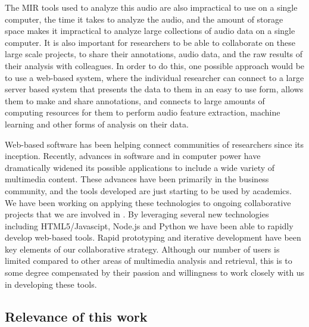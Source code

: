 \documentclass[12pt,oneside]{book}
\begin{document}
The MIR tools used to analyze this audio are also impractical to use
on a single computer, the time it takes to analyze the audio, and the
amount of storage space makes it impractical to analyze large
collections of audio data on a single computer.  It is also important
for researchers to be able to collaborate on these large scale
projects, to share their annotations, audio data, and the raw results
of their analysis with colleagues.  In order to do this, one possible
approach would be to use a web-based system, where the individual
researcher can connect to a large server based system that presents
the data to them in an easy to use form, allows them to make and share
annotations, and connects to large amounts of computing resources for
them to perform audio feature extraction, machine learning and other
forms of analysis on their data.
 
Web-based software has been helping connect communities of researchers
since its inception.  Recently, advances in software and in computer
power have dramatically widened its possible applications to include a
wide variety of multimedia content.  These advances have been
primarily in the business community, and the tools developed are just
starting to be used by academics. We have been working on applying
these technologies to ongoing collaborative projects that we are
involved in \cite{sness2008}. By leveraging several new technologies
including HTML5/Javascipt, Node.js and Python we have been able to
rapidly develop web-based tools.  Rapid prototyping and iterative
development have been key elements of our collaborative
strategy. Although our number of users is limited compared to other
areas of multimedia analysis and retrieval, this is to some degree
compensated by their passion and willingness to work closely with us
in developing these tools.


\subsection{Relevance of this work}
\end{document}
